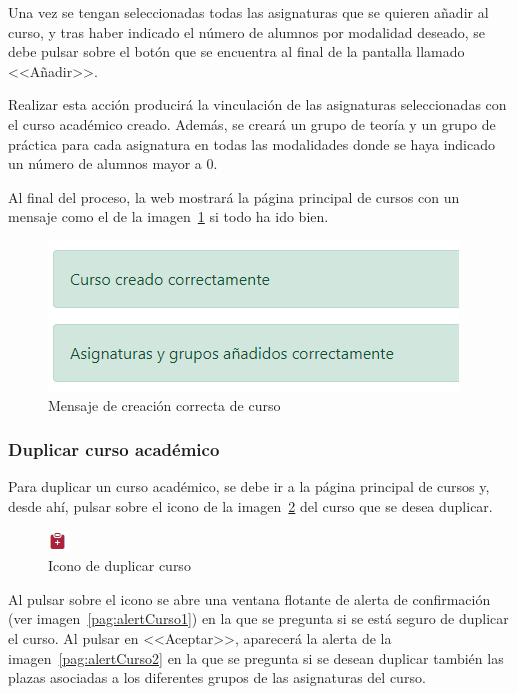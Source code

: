 Una vez se tengan seleccionadas todas las asignaturas que se quieren añadir al curso, y tras haber indicado el número de alumnos por modalidad deseado, se debe pulsar sobre el botón que se encuentra al final de la pantalla llamado <<Añadir>>.

Realizar esta acción producirá la vinculación de las asignaturas seleccionadas con el curso académico creado.
Además, se creará un grupo de teoría y un grupo de práctica para cada asignatura en todas las modalidades donde se haya indicado un número de alumnos mayor a 0.

Al final del proceso, la web mostrará la página principal de cursos con un mensaje como el de la imagen~\ref{pag:mensajeCursoNuevo} si todo ha ido bien.

\begin{figure}
	\centering
	\includegraphics[width=.5\textwidth]{../img/Anexos/Manual usuario/mensajeCursoNuevo.png}
	\caption{Mensaje de creación correcta de curso}\label{pag:mensajeCursoNuevo}
\end{figure}

\subsubsection{Duplicar curso académico}
Para duplicar un curso académico, se debe ir a la página principal de cursos y, desde ahí, pulsar sobre el icono de la imagen~\ref{pag:icnDuplicarCurso} del curso que se desea duplicar.
\begin{figure}
	\centering
	\includegraphics[width=.08\textwidth]{../img/Anexos/Manual usuario/icnDuplicarCurso.png}
	\caption{Icono de duplicar curso}\label{pag:icnDuplicarCurso}
\end{figure}

Al pulsar sobre el icono se abre una ventana flotante de alerta de confirmación (ver imagen~\ref{pag:alertCurso1}) en la que se pregunta si se está seguro de duplicar el curso.
Al pulsar en <<Aceptar>>, aparecerá la alerta de la imagen~\ref{pag:alertCurso2} en la que se pregunta si se desean duplicar también las plazas asociadas a los diferentes grupos de las asignaturas del curso.

